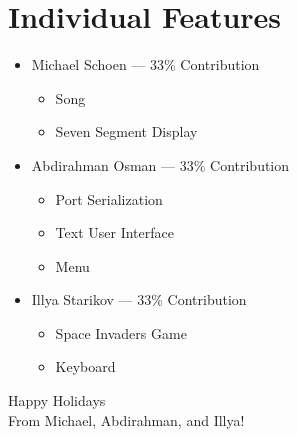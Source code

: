 \documentclass[12pt]{article}
\begin{document}
\section{Individual Features}
\begin{itemize}
    \item Michael Schoen --- 33\% Contribution
    \begin{itemize}
        \item Song
        \item Seven Segment Display
    \end{itemize}

    \item Abdirahman Osman --- 33\% Contribution
    \begin{itemize}
        \item Port Serialization
        \item Text User Interface
        \item Menu
    \end{itemize}

    \item Illya Starikov --- 33\% Contribution
    \begin{itemize}
        \item Space Invaders Game
        \item Keyboard
    \end{itemize}
\end{itemize}

\centering
\Huge Happy Holidays \\ From Michael, Abdirahman, and Illya!
\end{document}
